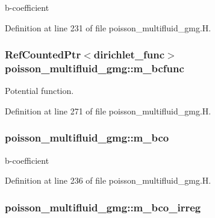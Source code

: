 b-\/coefficient 



Definition at line 231 of file poisson\+\_\+multifluid\+\_\+gmg.\+H.

\subsubsection[{\texorpdfstring{m\+\_\+bcfunc}{m_bcfunc}}]{\setlength{\rightskip}{0pt plus 5cm}Ref\+Counted\+Ptr$<${\bf dirichlet\+\_\+func}$>$ poisson\+\_\+multifluid\+\_\+gmg\+::m\+\_\+bcfunc\hspace{0.3cm}{\ttfamily [protected]}}\hypertarget{classpoisson__multifluid__gmg_a695568c8da86e4c3ebd8f1f5b74b126d}{}\label{classpoisson__multifluid__gmg_a695568c8da86e4c3ebd8f1f5b74b126d}


Potential function. 



Definition at line 271 of file poisson\+\_\+multifluid\+\_\+gmg.\+H.

\subsubsection[{\texorpdfstring{m\+\_\+bco}{m_bco}}]{ poisson\+\_\+multifluid\+\_\+gmg\+::m\+\_\+bco\hspace{0.3cm}{\ttfamily [protected]}}\hypertarget{classpoisson__multifluid__gmg_a7fff02b127ccc850b64d1ce782299c5f}{}\label{classpoisson__multifluid__gmg_a7fff02b127ccc850b64d1ce782299c5f}


b-\/coefficient 



Definition at line 236 of file poisson\+\_\+multifluid\+\_\+gmg.\+H.

\subsubsection[{\texorpdfstring{m\+\_\+bco\+\_\+irreg}{m_bco_irreg}}]{ poisson\+\_\+multifluid\+\_\+gmg\+::m\+\_\+bco\+\_\+irreg\hspace{0.3cm}{\ttfamily [protected]}}\hypertarget{classpoisson__multifluid__gmg_a7b854b8b2557bd3d312a4cff868779fc}{}\label{classpoisson__multifluid__gmg_a7b854b8b2557bd3d312a4cff868779fc}


